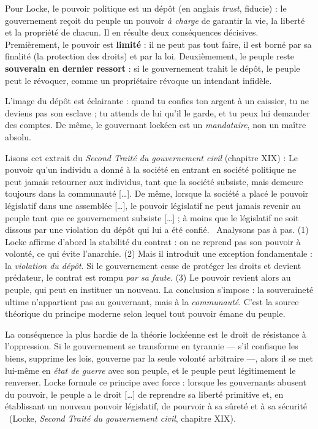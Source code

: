 \documentclass[11pt]{article}
\newcommand{\cle}[1]{{\popxbold\color{popdark}#1}}
\newcounter{popsec}
\newcounter{popsub}
\newcommand{\courssub}[1]{%
  \stepcounter{popsub}%
  \par\vspace{9pt}\noindent{\popxbold\fontsize{11.5}{13}\selectfont\color{popink}{\color{poporange}\thepopsec.\thepopsub}\hspace{6pt}#1}\par\nopagebreak\vspace{4pt}
}
\begin{document}
\begin{propriete}
Pour Locke, le pouvoir politique est un \cle{dépôt} (en anglais \emph{trust}, fiducie) : le gouvernement reçoit du peuple un pouvoir \emph{à charge} de garantir la vie, la liberté et la propriété de chacun. Il en résulte deux conséquences décisives. Premièrement, le pouvoir est \textbf{limité} : il ne peut pas tout faire, il est borné par sa finalité (la protection des droits) et par la loi. Deuxièmement, le peuple reste \textbf{souverain en dernier ressort} : si le gouvernement trahit le dépôt, le peuple peut le révoquer, comme un propriétaire révoque un intendant infidèle.
\end{propriete}

L'image du dépôt est éclairante : quand tu confies ton argent à un caissier, tu ne deviens pas son esclave ; tu attends de lui qu'il le garde, et tu peux lui demander des comptes. De même, le gouvernant lockéen est un \emph{mandataire}, non un maître absolu.

\begin{experience}
Lisons cet extrait du \emph{Second Traité du gouvernement civil} (chapitre XIX) : \guillemotleft Le pouvoir qu'un individu a donné à la société en entrant en société politique ne peut jamais retourner aux individus, tant que la société subsiste, mais demeure toujours dans la communauté [\dots]. De même, lorsque la société a placé le pouvoir législatif dans une assemblée [\dots], le pouvoir législatif ne peut jamais revenir au peuple tant que ce gouvernement subsiste [\dots] ; à moins que le législatif ne soit dissous par une violation du dépôt qui lui a été confié. \guillemotright\
Analysons pas à pas. (1) Locke affirme d'abord la stabilité du contrat : on ne reprend pas son pouvoir à volonté, ce qui évite l'anarchie. (2) Mais il introduit une exception fondamentale : la \emph{violation du dépôt}. Si le gouvernement cesse de protéger les droits et devient prédateur, le contrat est rompu \emph{par sa faute}. (3) Le pouvoir revient alors au peuple, qui peut en instituer un nouveau. La conclusion s'impose : la souveraineté ultime n'appartient pas au gouvernant, mais à la \emph{communauté}. C'est la source théorique du principe moderne selon lequel tout pouvoir émane du peuple.
\end{experience}

\courssub{Le droit de résistance : la réponse décisive à Hobbes}

La conséquence la plus hardie de la théorie lockéenne est le \cle{droit de résistance à l'oppression}. Si le gouvernement se transforme en tyrannie --- s'il confisque les biens, supprime les lois, gouverne par la seule volonté arbitraire ---, alors il se met lui-même en \emph{état de guerre} avec son peuple, et le peuple peut légitimement le renverser. Locke formule ce principe avec force : lorsque les gouvernants abusent du pouvoir, \guillemotleft le peuple a le droit [\dots] de reprendre sa liberté primitive et, en établissant un nouveau pouvoir législatif, de pourvoir à sa sûreté et à sa sécurité \guillemotright\ (Locke, \emph{Second Traité du gouvernement civil}, chapitre XIX).
\end{document}
